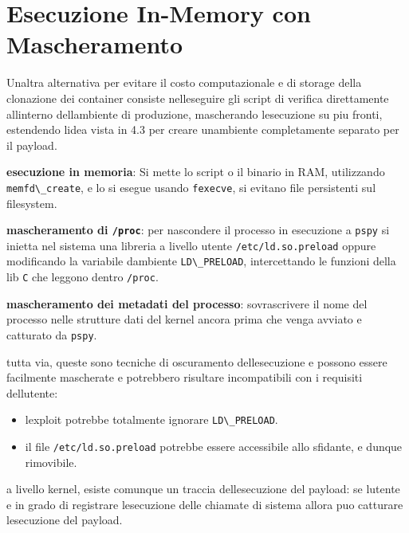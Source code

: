 \section{Esecuzione In-Memory con
Mascheramento}\label{esecuzione-in-memory-con-mascheramento}

Un\textquotesingle altra alternativa per evitare il costo computazionale
e di storage della clonazione dei container consiste
nell\textquotesingle eseguire gli script di verifica direttamente
all\textquotesingle interno dell\textquotesingle ambiente di produzione,
mascherando l\textquotesingle esecuzione su piu fronti, estendendo
l\textquotesingle idea vista in 4.3 per creare
un\textquotesingle ambiente completamente separato per il payload.

\textbf{esecuzione in memoria}: Si mette lo script o il binario in RAM,
utilizzando \passthrough{\lstinline!memfd\_create!}, e lo si esegue
usando \passthrough{\lstinline!fexecve!}, si evitano file persistenti
sul filesystem.

\textbf{mascheramento di \passthrough{\lstinline!/proc!}}: per
nascondere il processo in esecuzione a \passthrough{\lstinline!pspy!} si
inietta nel sistema una libreria a livello utente
\passthrough{\lstinline!/etc/ld.so.preload!} oppure modificando la
variabile d\textquotesingle ambiente
\passthrough{\lstinline!LD\_PRELOAD!}, intercettando le funzioni della
lib \passthrough{\lstinline!C!} che leggono dentro
\passthrough{\lstinline!/proc!}.

\textbf{mascheramento dei metadati del processo}: sovrascrivere il nome
del processo nelle strutture dati del kernel ancora prima che venga
avviato e catturato da \passthrough{\lstinline!pspy!}.

tutta via, queste sono tecniche di oscuramento
dell\textquotesingle esecuzione e possono essere facilmente mascherate e
potrebbero risultare incompatibili con i requisiti
dell\textquotesingle utente:

\begin{itemize}
\tightlist
\item
  l\textquotesingle exploit potrebbe totalmente ignorare
  \passthrough{\lstinline!LD\_PRELOAD!}.
\item
  il file \passthrough{\lstinline!/etc/ld.so.preload!} potrebbe essere
  accessibile allo sfidante, e dunque rimovibile.
\end{itemize}

a livello kernel, esiste comunque un traccia
dell\textquotesingle esecuzione del payload: se l\textquotesingle utente
e\textquotesingle{} in grado di registrare l\textquotesingle esecuzione
delle chiamate di sistema allora puo\textquotesingle{} catturare
l\textquotesingle esecuzione del payload.

